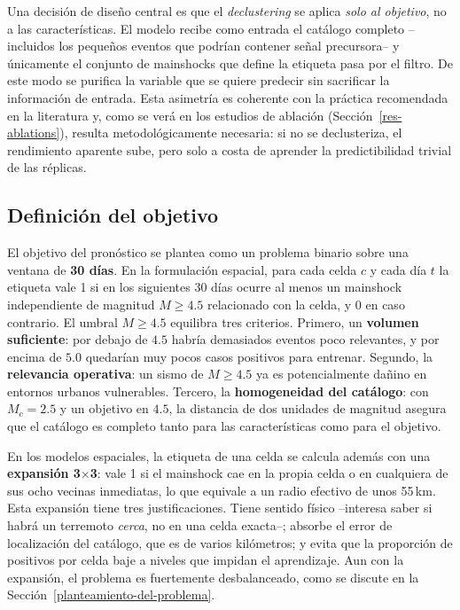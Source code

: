 Una decisión de diseño central es que el \textit{declustering} se aplica \emph{solo al
  objetivo}, no a las características. El modelo recibe como entrada el catálogo completo
--incluidos los pequeños eventos que podrían contener señal precursora-- y únicamente el
conjunto de mainshocks que define la etiqueta pasa por el filtro. De este modo se purifica
la variable que se quiere predecir sin sacrificar la información de entrada. Esta asimetría
es coherente con la práctica recomendada en la literatura y, como se verá en los estudios
de ablación (Sección~\ref{res-ablations}), resulta metodológicamente necesaria: si no se
declusteriza, el rendimiento aparente sube, pero solo a costa de aprender la
predictibilidad trivial de las réplicas.

\subsection{Definición del objetivo}
\label{md-target}

El objetivo del pronóstico se plantea como un problema binario sobre una ventana de
\textbf{30 días}. En la formulación espacial, para cada celda \(c\) y cada día \(t\) la
etiqueta vale 1 si en los siguientes 30 días ocurre al menos un mainshock independiente de
magnitud \(M \geq 4.5\) relacionado con la celda, y 0 en caso contrario. El umbral
\(M \geq 4.5\) equilibra tres criterios. Primero, un \textbf{volumen suficiente}: por
debajo de \(4.5\) habría demasiados eventos poco relevantes, y por encima de \(5.0\)
quedarían muy pocos casos positivos para entrenar. Segundo, la \textbf{relevancia
  operativa}: un sismo de \(M \geq 4.5\) ya es potencialmente dañino en entornos urbanos
vulnerables. Tercero, la \textbf{homogeneidad del catálogo}: con \(M_c = 2.5\) y un
objetivo en \(4.5\), la distancia de dos unidades de magnitud asegura que el catálogo es
completo tanto para las características como para el objetivo.

En los modelos espaciales, la etiqueta de una celda se calcula además con una
\textbf{expansión 3\(\times\)3}: vale 1 si el mainshock cae en la propia celda o en
cualquiera de sus ocho vecinas inmediatas, lo que equivale a un radio efectivo de unos
55\,km. Esta expansión tiene tres justificaciones. Tiene sentido físico --interesa saber si
habrá un terremoto \emph{cerca}, no en una celda exacta--; absorbe el error de localización
del catálogo, que es de varios kilómetros; y evita que la proporción de positivos por celda
baje a niveles que impidan el aprendizaje. Aun con la expansión, el problema es fuertemente
desbalanceado, como se discute en la Sección~\ref{planteamiento-del-problema}.

